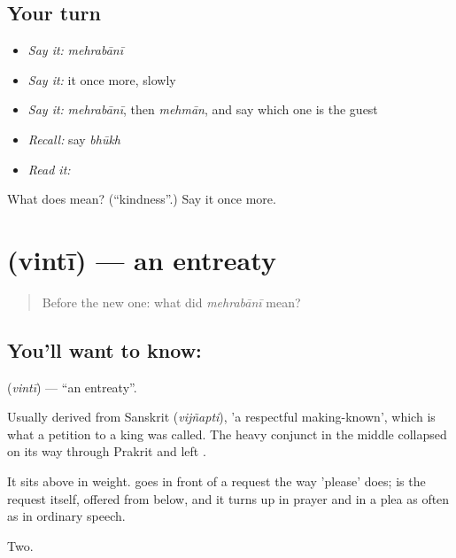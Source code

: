 \subsection*{Your turn}
\begin{itemize}
\raggedright
  \item \emph{Say it:} \emph{mehrabānī}
  \item \emph{Say it:} it once more, slowly
  \item \emph{Say it:} \emph{mehrabānī}, then \emph{mehmān}, and say which one is the guest
  \item \emph{Recall:} say \emph{bhūkh}
  \item \emph{Read it:} \textbf{}
\end{itemize}

\begin{tcolorbox}[breakable,colback=teal!4,colframe=teal!35!black,title={Before you move on}]
What does  mean? (\textquotedblleft{}kindness\textquotedblright{}.) Say it once more.
\end{tcolorbox}
\section[\texorpdfstring{\hi{विनती} (vintī)}{विनती (vintī)}]{ (vintī) — an entreaty}

\label{lesson:HI-C65-entreaty}



\begin{quote}
Before the new one: what did \emph{mehrabānī} mean?
\end{quote}

\subsection*{You'll want to know: }
\textbf{} (\emph{vintī}) — \textquotedblleft{}an entreaty\textquotedblright{}.

Usually derived from Sanskrit  (\emph{vijñapti}), 'a respectful making-known', which is what a petition to a king was called. The heavy conjunct in the middle collapsed on its way through Prakrit and left .

It sits above  in weight.  goes in front of a request the way 'please' does;  is the request itself, offered from below, and it turns up in prayer and in a plea as often as in ordinary speech.

\begin{grammarlens}[title={What you've built}]
Two.
\end{grammarlens}

